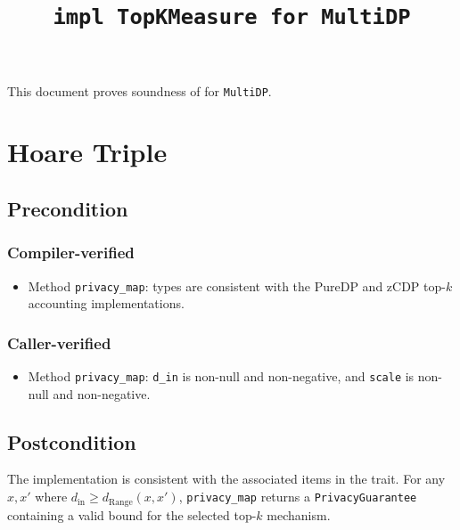 \documentclass{article}
\title{\texttt{impl TopKMeasure for MultiDP}}
\author{\MichaelShoemateAuthor}
\begin{document}
\maketitle

This document proves soundness of  for \texttt{MultiDP}.

\section{Hoare Triple}
\subsection*{Precondition}
\subsubsection*{Compiler-verified}
\begin{itemize}
    \item Method \texttt{privacy\_map}: types are consistent with the PureDP and zCDP top-$k$ accounting implementations.
\end{itemize}

\subsubsection*{Caller-verified}
\begin{itemize}
    \item Method \texttt{privacy\_map}: \texttt{d\_in} is non-null and non-negative, and \texttt{scale} is non-null and non-negative.
\end{itemize}

\subsection*{Postcondition}
\begin{theorem}
    The implementation is consistent with the associated items in the  trait.
    For any $x, x'$ where $d_\mathrm{in} \ge d_\mathrm{Range}(x, x')$, \texttt{privacy\_map} returns a \texttt{PrivacyGuarantee} containing a valid bound for the selected top-$k$ mechanism.
\end{theorem}
\end{document}
